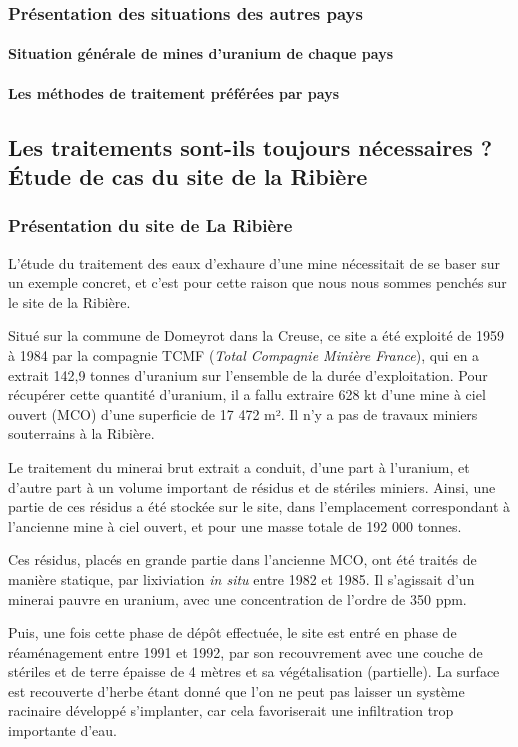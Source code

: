 \documentclass{article}
\begin{document}
\subsubsection{Présentation des situations des autres pays}
\paragraph{Situation générale de mines d’uranium de chaque pays}
\paragraph{Les méthodes de traitement préférées par pays}

\subsection{Les traitements sont-ils toujours nécessaires ? Étude de cas du site de la Ribière}
\subsubsection{Présentation du site de La Ribière}
L’étude du traitement des eaux d’exhaure d’une mine nécessitait de se baser sur un exemple concret, et c’est pour cette raison que nous nous sommes penchés sur le site de la Ribière. 

Situé sur la commune de Domeyrot dans la Creuse, ce site a été exploité de 1959 à 1984 par la compagnie TCMF (\emph{Total Compagnie Minière France}), qui en a extrait 142,9 tonnes d’uranium sur l’ensemble de la durée d’exploitation. Pour récupérer cette quantité d’uranium, il a fallu extraire 628 kt d’une mine à ciel ouvert (MCO) d’une superficie de 17 472 m². Il n’y a pas de travaux miniers souterrains à la Ribière.

Le traitement du minerai brut extrait a conduit, d’une part à l’uranium, et d’autre part à un volume important de résidus et de stériles miniers. Ainsi, une partie de ces résidus a été stockée sur le site, dans l’emplacement correspondant à l'ancienne mine à ciel ouvert, et pour une masse totale de 192 000 tonnes.

Ces résidus, placés en grande partie dans l’ancienne MCO, ont été traités de manière statique, par lixiviation \textit{in situ} entre 1982 et 1985. Il s'agissait d’un minerai pauvre en uranium, avec une concentration de l’ordre de 350 ppm. 

Puis, une fois cette phase de dépôt effectuée, le site est entré en phase de réaménagement entre 1991 et 1992, par son recouvrement avec une couche de stériles et de terre épaisse de 4 mètres et sa végétalisation (partielle). La surface est recouverte d’herbe étant donné que l’on ne peut pas laisser un système racinaire développé s’implanter, car cela favoriserait une infiltration trop importante d’eau.
\end{document}
